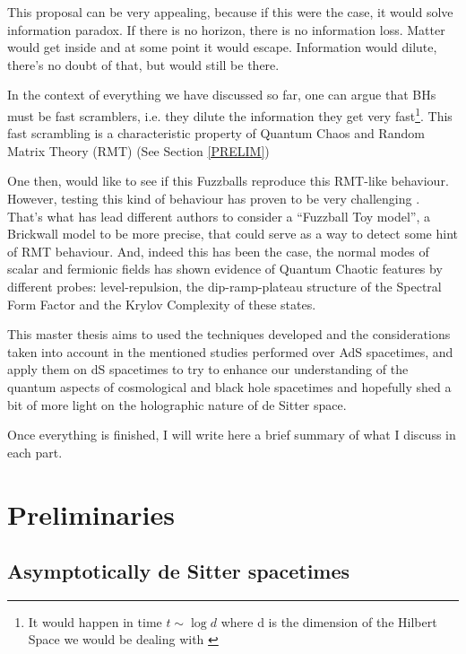 \documentclass[11pt,a4paper]{article}
\begin{document}
This proposal can be very appealing, because if this were the case, it would solve information paradox. If there is no horizon, there is no information loss. Matter would get inside and at some point it would escape. Information would dilute, there's no doubt of that, but would still be there.

In the context of everything we have discussed so far, one can argue that BHs must be fast scramblers, i.e. they dilute the information they get very fast\footnote{It would happen in time $t\sim \log d$ where d is the dimension of the Hilbert Space we would be dealing with \cite{Sekino_2008}}. This fast scrambling is a characteristic property of Quantum Chaos and Random Matrix Theory (RMT) (See Section \ref{PRELIM})

One then, would like to see if this Fuzzballs reproduce this RMT-like behaviour. However, testing this kind of behaviour has proven to be very challenging \cite{Das_2023}. That's what has lead different authors \cite{Das_2023,Jeong_2025,das2023fuzzballsrandommatrices,das2023brickwallrotatingbtzdiprampplateau,das2025brickwalladsschwarzschildblack} to consider a \textquotedblleft Fuzzball Toy model\textquotedblright, a Brickwall model to be more precise, that could serve as a way to detect some hint of RMT behaviour. And, indeed this has been the case, the normal modes of scalar and fermionic fields has shown evidence of Quantum Chaotic features by different probes: level-repulsion, the dip-ramp-plateau structure of the Spectral Form Factor and the Krylov Complexity of these states.

This master thesis aims to used the techniques developed and the considerations taken into account in the mentioned studies performed over AdS spacetimes, and apply them on dS spacetimes to try to enhance our understanding of the quantum aspects of cosmological and black hole spacetimes and hopefully shed a bit of more light on the holographic nature of de Sitter space.

{\noindent\color{red} Once everything is finished, I will write here a brief summary of what I discuss in each part.}

%    

\section{Preliminaries}
\subsection{Asymptotically de Sitter spacetimes}
\end{document}

